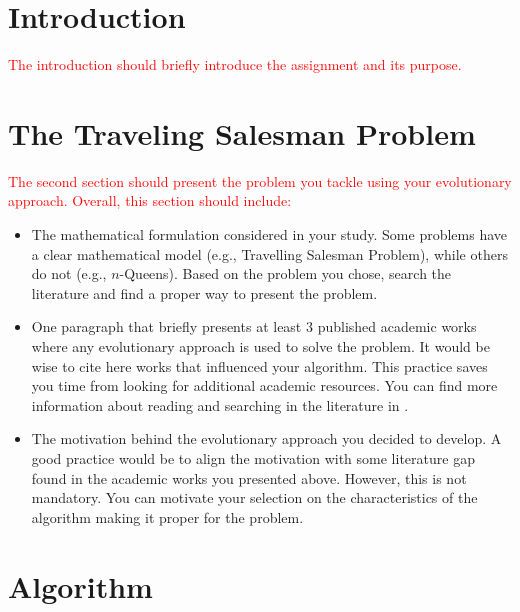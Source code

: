 \documentclass{scrartcl}
\title{\reportname}
\subtitle{An Evolutionary Algorithm for the Traveling Salesman Problem}
\author{\docauthor}
\date{\today}
\begin{document}
\maketitle



\section{Introduction}
\label{sec:intro}

\textcolor{red}{The introduction should briefly introduce the assignment and its purpose.}

\lipsum[4]


\section{The Traveling Salesman Problem}
\label{sec:problem_description}

\textcolor{red}{The second section should present the problem you tackle using your evolutionary approach. Overall, this section should include:}

{\color{red}
\begin{itemize}
    \item The mathematical formulation considered in your study. Some problems have a clear mathematical model (e.g., Travelling Salesman Problem), while others do not (e.g., $n$-Queens). Based on the problem you chose, search the literature and find a proper way to present the problem.
    \item One paragraph that briefly presents at least 3 published academic works where any evolutionary approach is used to solve the problem. It would be wise to cite here works that influenced your algorithm. This practice saves you time from looking for additional academic resources. You can find more information about reading and searching in the literature in \cite{zobel2014reading}.
    \item The motivation behind the evolutionary approach you decided to develop. A good practice would be to align the motivation with some literature gap found in the academic works you presented above. However, this is not mandatory. You can motivate your selection on the characteristics of the algorithm making it proper for the problem.
\end{itemize}
}

\lipsum[2]


\section{Algorithm}
\label{sec:algorithm}
\end{document}
